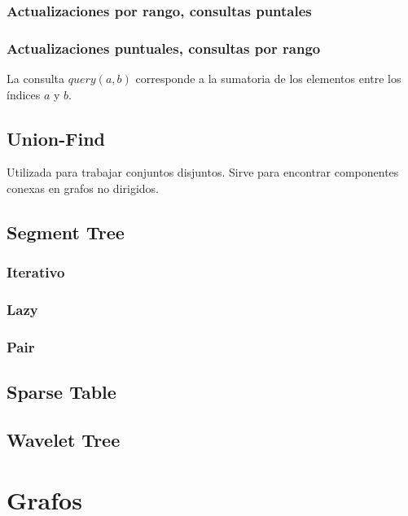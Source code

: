 \documentclass[oneside]{book}
\begin{document}
	\subsection{Actualizaciones por rango, consultas puntales }
	
	\pagebreak
	\subsection{Actualizaciones puntuales, consultas por rango}
	La consulta $query(a,b)$ corresponde a la sumatoria de los elementos entre los \'indices $a$ y $b$. 
	
	
	\section{Union-Find}
	Utilizada para trabajar conjuntos disjuntos. Sirve para encontrar componentes conexas en grafos no dirigidos.   
	
	\section{Segment Tree}
		\subsection{Iterativo}
			
		\subsection{Lazy}
			
		\subsection{Pair}
			
	\section{Sparse Table}
		
			
	\section{Wavelet Tree}
		
		
			

	
	\chapter{Grafos}
\end{document}
